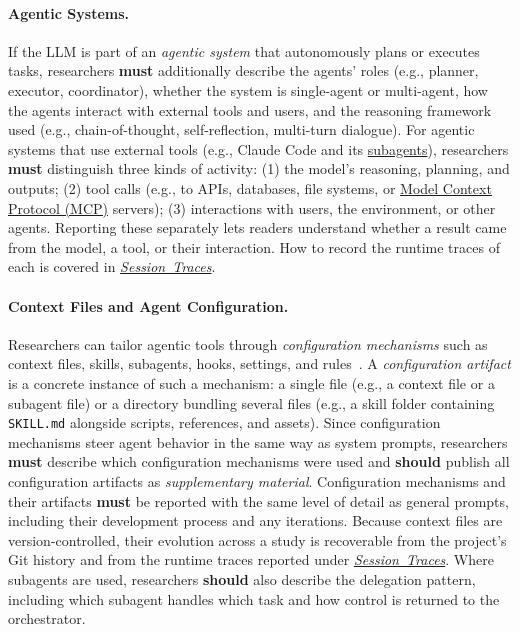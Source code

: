 \documentclass[smallextended]{svjour3}
\newcommand{\must}{\textbf{must}\xspace}
\newcommand{\should}{\textbf{should}\xspace}
\newcommand{\supplementarymaterial}{\emph{supplementary material}\xspace}
\newcommand{\supplementarymaterial}{\emph{supplementary material}\xspace}
\newcommand{\traces}{\hyperref[sec:report-session-traces]{\mbox{\emph{Session Traces}}}\xspace}
\newcommand{\traces}{\href{/guidelines/traces/}{\emph{Session Traces}}\xspace}
\newcommand{\guidelineparagraph}[1]{\paragraph{#1.}}
\newcommand{\guidelineparagraph}[1]{\paragraph{#1}}
\begin{document}
\guidelineparagraph{Agentic Systems}
If the LLM is part of an \emph{agentic system} that autonomously plans or executes tasks, researchers \must additionally describe the agents' roles (e.g., planner, executor, coordinator), whether the system is single-agent or multi-agent, how the agents interact with external tools and users, and the reasoning framework used (e.g., chain-of-thought, self-reflection, multi-turn dialogue).
For agentic systems that use external tools (e.g., Claude Code and its \href{https://code.claude.com/docs/en/sub-agents}{subagents}), researchers \must distinguish three kinds of activity: (1) the model's reasoning, planning, and outputs; (2) tool calls (e.g., to APIs, databases, file systems, or \href{https://modelcontextprotocol.io/}{Model Context Protocol (MCP)} servers); (3) interactions with users, the environment, or other agents.
Reporting these separately lets readers understand whether a result came from the model, a tool, or their interaction. How to record the runtime traces of each is covered in \traces.

\guidelineparagraph{Context Files and Agent Configuration}
Researchers can tailor agentic tools through \emph{configuration mechanisms} such as context files, skills, subagents, hooks, settings, and rules~\cite{galster2026configuring}.
A \emph{configuration artifact} is a concrete instance of such a mechanism: a single file (e.g., a context file or a subagent file) or a directory bundling several files (e.g., a skill folder containing \texttt{SKILL.md} alongside scripts, references, and assets).
Since configuration mechanisms steer agent behavior in the same way as system prompts, researchers \must describe which configuration mechanisms were used and \should publish all configuration artifacts as \supplementarymaterial.
Configuration mechanisms and their artifacts \must be reported with the same level of detail as general prompts, including their development process and any iterations.
Because context files are version-controlled, their evolution across a study is recoverable from the project's Git history and from the runtime traces reported under \traces.
Where subagents are used, researchers \should also describe the delegation pattern, including which subagent handles which task and how control is returned to the orchestrator.
\end{document}
